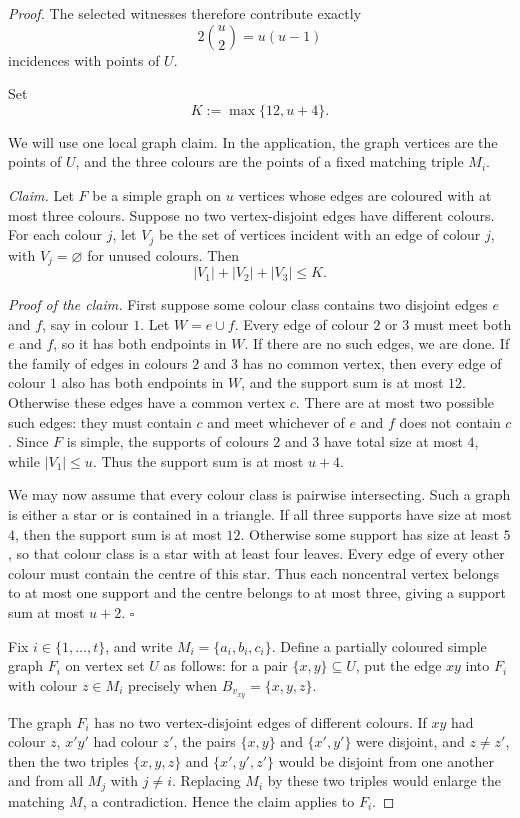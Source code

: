 \documentclass[11pt]{amsart}
\theoremstyle{remark}
\begin{document}
\begin{proof}
The selected witnesses therefore contribute exactly
\[
  2\binom u2=u(u-1)
\]
incidences with points of $U$.

Set
\[
  K:=\max\{12,u+4\}.
\]

We will use one local graph claim.  In the application, the graph vertices are
the points of $U$, and the three colours are the points of a fixed matching
triple $M_i$.

\smallskip
\noindent\emph{Claim.}
Let $F$ be a simple graph on $u$ vertices whose edges are coloured with at
most three colours.  Suppose no two vertex-disjoint edges have different
colours.  For each colour $j$, let $V_j$ be the set of vertices incident with
an edge of colour $j$, with $V_j=\varnothing$ for unused colours.  Then
\[
  |V_1|+|V_2|+|V_3|\le K.
\]

\smallskip
\noindent\emph{Proof of the claim.}
First suppose some colour class contains two disjoint edges $e$ and $f$, say
in colour $1$.  Let $W=e\cup f$.  Every edge of colour $2$ or $3$ must meet
both $e$ and $f$, so it has both endpoints in $W$.  If there are no such
edges, we are done.  If the family of edges in colours $2$ and $3$ has no
common vertex, then every edge of colour $1$ also has both endpoints in $W$,
and the support sum is at most $12$.  Otherwise these edges have a common
vertex $c$.  There are at most two possible such edges: they must contain $c$
and meet whichever of $e$ and $f$ does not contain $c$.  Since $F$ is simple,
the supports of colours $2$ and $3$ have total size at most $4$, while
$|V_1|\le u$.
Thus the support sum is at most $u+4$.

We may now assume that every colour class is pairwise intersecting.  Such a
graph is either a star or is contained in a triangle.  If all three supports
have size at most $4$, then the support sum is at most $12$.  Otherwise some
support has size at least $5$, so that colour class is a star with at least
four leaves.  Every edge of every other colour must contain the centre of this
star.  Thus each noncentral vertex belongs to at most one support and the
centre belongs to at most three, giving a support sum at most $u+2$.
\hfill$\square$

\smallskip

Fix $i\in\{1,\ldots,t\}$, and write $M_i=\{a_i,b_i,c_i\}$.  Define a
partially coloured simple graph $F_i$ on vertex set $U$ as follows: for a pair
$\{x,y\}\subseteq U$, put the edge $xy$ into $F_i$ with colour
$z\in M_i$ precisely when $B_{v_{xy}}=\{x,y,z\}$.

The graph $F_i$ has no two vertex-disjoint edges of different colours.  If
$xy$ had colour $z$, $x'y'$ had colour $z'$, the pairs $\{x,y\}$ and
$\{x',y'\}$ were disjoint, and $z\ne z'$, then the two triples
$\{x,y,z\}$ and $\{x',y',z'\}$ would be disjoint from one another and from all
$M_j$ with $j\ne i$.  Replacing $M_i$ by these two triples would enlarge the
matching $M$, a contradiction.  Hence the claim applies to $F_i$.


\end{proof}
\end{document}
